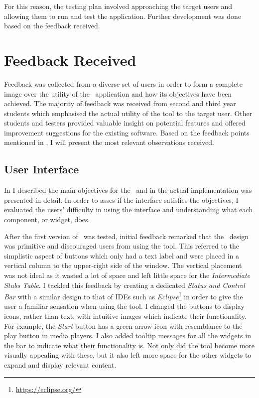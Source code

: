 For this reason, the testing plan involved approaching the target users and allowing them to run and test the application. Further development was done based on the feedback received.

\section{Feedback Received}
\label{sec:feedback-received}

Feedback was collected from a diverse set of users in order to form a complete image over the utility of the \project\ application and how its objectives have been achieved. The majority of feedback was received from second and third year students which emphasised the actual utility of the tool to the target user. Other students and testers provided valuable insight on potential features and offered improvement suggestions for the existing software. Based on the feedback points mentioned in , I will present the most relevant observations received.

\subsection{User Interface}
\label{sub-sec:user-interface-feedback}

In  I described the main objectives for the \gui\ and in  the actual implementation was presented in detail. In order to asses if the interface satisfies the objectives, I evaluated the users' difficulty in using the interface and understanding what each component, or widget, does.

After the first version of \project\ was tested, initial feedback remarked that the \gui\ design was primitive and discouraged users from using the tool. This referred to the simplistic aspect of buttons which only had a text label and were placed in a vertical column to the upper-right side of the window. The vertical placement was not ideal as it wasted a lot of space and left little space for the \textit{Intermediate Stubs Table}. I tackled this feedback by creating a dedicated \textit{Status and Control Bar} with a similar design to that of IDEs such as \textit{Eclipse}\footnote{\url{https://eclipse.org/}} in order to give the user a familiar sensation when using the tool. I changed the buttons to display icons, rather than text, with intuitive images which indicate their functionality. For example, the \textit{Start} button has a green arrow icon with resemblance to the play button in media players. I also added tooltip messages for all the widgets in the bar to indicate what their functionality is. Not only did the tool become more visually appealing with these, but it also left more space for the other widgets to expand and display relevant content.

